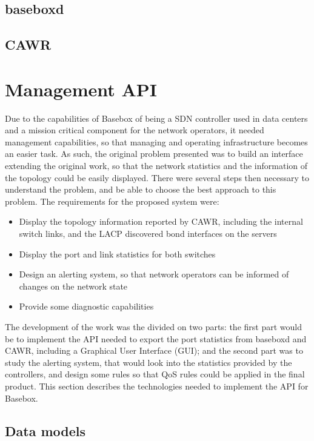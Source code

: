 \subsection {baseboxd}
\subsection {CAWR}

\section {Management API}

Due to the capabilities of Basebox of being a SDN controller used in data centers and a mission critical component for the network operators, it needed management capabilities, so that managing and operating infrastructure becomes 
an easier task. As such, the original problem presented was to build an interface extending the original work, so that the network statistics and the information of the topology could be easily displayed. There were several steps
then necessary to understand the problem, and be able to choose the best approach to this problem. The requirements for the proposed system were:

\begin {itemize}
    \item Display the topology information reported by CAWR, including the internal switch links, and the LACP discovered bond interfaces on the servers
    \item Display the port and link statistics for both switches
    \item Design an alerting system, so that network operators can be informed of changes on the network state
    \item Provide some diagnostic capabilities
\end {itemize}

\par The development of the work was the divided on two parts: the first part would be to implement the API needed to export the port statistics from baseboxd and CAWR, including a Graphical User Interface (GUI); and the second 
part was to study the alerting system, that would look into the statistics provided by the controllers, and design some rules so that QoS rules could be applied in the final product. This section describes the technologies needed 
to implement the API for Basebox.

\subsection {Data models}

